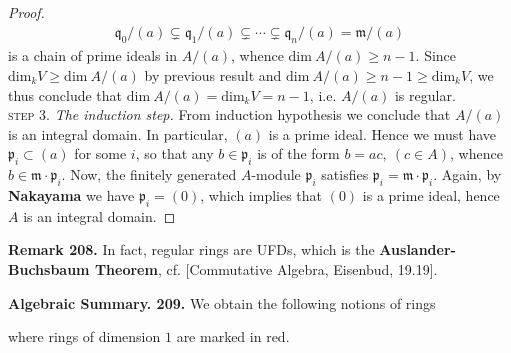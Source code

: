 \documentclass[12pt,a4paper,footinclude=true,headinclude=true]{scrbook} %
\newenvironment{remark}[2][Remark]
    { \begin{mdframed}[backgroundcolor=gray!20] \textbf{#1 #2.} }
    {  \end{mdframed}}
\newenvironment{summary}[2][]
    { \begin{mdframed}[backgroundcolor=gray!20] \textbf{#1 #2.} }
    {  \end{mdframed}}
\begin{document}
\begin{proof}
    \begin{align*}
        \mathfrak{q}_0/(a)\subsetneq\mathfrak{q}_1/(a)\subsetneq\cdots\subsetneq\mathfrak{q}_n/(a)=\mathfrak{m}/(a)
    \end{align*}
    is a chain of prime ideals in $A/(a)$, whence $\mathrm{dim}\ A/(a)\geq n-1$. Since $\mathrm{dim}_kV\geq\mathrm{dim}\ A/(a)$ by previous result and $\mathrm{dim}\ A/(a)\geq n-1\geq\mathrm{dim}_kV$, we thus conclude that $\mathrm{dim}\ A/(a)=\mathrm{dim}_kV=n-1$, i.e. $A/(a)$ is regular.\\
    \textsc{step 3.} \textit{The induction step.} From induction hypothesis we conclude that $A/(a)$ is an integral domain. In particular, $(a)$ is a prime ideal. Hence we must have $\mathfrak{p}_i\subset(a)$ for some $i$, so that any $b\in\mathfrak{p}_i$ is of the form $b=ac,\ (c\in A)$, whence $b\in\mathfrak{m}\cdot\mathfrak{p}_i$. Now, the finitely generated $A$-module $\mathfrak{p}_i$ satisfies $\mathfrak{p}_i=\mathfrak{m}\cdot\mathfrak{p}_i$. Again, by \textbf{Nakayama} we have $\mathfrak{p}_i=(0)$, which implies that $(0)$ is a prime ideal, hence $A$ is an integral domain.
\end{proof}
\newpage
\begin{remark}{208}
    In fact, regular rings are UFDs, which is the \textbf{Auslander-Buchsbaum Theorem}, cf. [Commutative Algebra, Eisenbud, 19.19].
\end{remark}

\begin{summary}{Algebraic Summary. 209}
    We obtain the following notions of rings
    \begin{center}
    \end{center}
    where rings of dimension $1$ are marked in red.
\end{summary}
\end{document}
